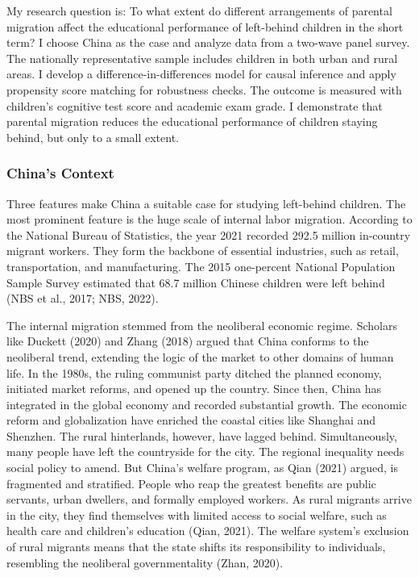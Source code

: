 \documentclass[
  man]{apa7}
\begin{document}
My research question is: To what extent do different arrangements of parental migration affect the educational performance of left-behind children in the short term? I choose China as the case and analyze data from a two-wave panel survey. The nationally representative sample includes children in both urban and rural areas. I develop a difference-in-differences model for causal inference and apply propensity score matching for robustness checks. The outcome is measured with children's cognitive test score and academic exam grade. I demonstrate that parental migration reduces the educational performance of children staying behind, but only to a small extent.

\hypertarget{chinas-context}{%
\subsubsection{China's Context}\label{chinas-context}}

Three features make China a suitable case for studying left-behind children. The most prominent feature is the huge scale of internal labor migration. According to the National Bureau of Statistics, the year 2021 recorded 292.5 million in-country migrant workers. They form the backbone of essential industries, such as retail, transportation, and manufacturing. The 2015 one-percent National Population Sample Survey estimated that 68.7 million Chinese children were left behind (NBS et al., 2017; NBS, 2022).

The internal migration stemmed from the neoliberal economic regime. Scholars like Duckett (2020) and Zhang (2018) argued that China conforms to the neoliberal trend, extending the logic of the market to other domains of human life. In the 1980s, the ruling communist party ditched the planned economy, initiated market reforms, and opened up the country. Since then, China has integrated in the global economy and recorded substantial growth. The economic reform and globalization have enriched the coastal cities like Shanghai and Shenzhen. The rural hinterlands, however, have lagged behind. Simultaneously, many people have left the countryside for the city. The regional inequality needs social policy to amend. But China's welfare program, as Qian (2021) argued, is fragmented and stratified. People who reap the greatest benefits are public servants, urban dwellers, and formally employed workers. As rural migrants arrive in the city, they find themselves with limited access to social welfare, such as health care and children's education (Qian, 2021). The welfare system's exclusion of rural migrants means that the state shifts its responsibility to individuals, resembling the neoliberal governmentality (Zhan, 2020).
\end{document}
